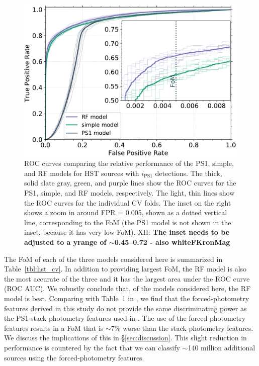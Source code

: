 \documentclass[twocolumn]{aastex63}
\newcommand{\xander}[1]{{\color{red} XH: \textbf{#1}}}
\begin{document}
\begin{figure}[t]
 \centering
  \includegraphics[width=\columnwidth]{./figures/CV_ROC_FHST.pdf}
  \caption{ ROC curves comparing the relative performance of the PS1, simple,
  and RF models for HST sources with $i_\mathrm{PS1}$ detections. The thick,
  solid slate gray, green, and purple lines show the ROC curves for the PS1,
  simple, and RF models, respectively. The light, thin lines show the ROC
  curves for the individual CV folds. The inset on the right shows a zoom in
  around FPR = 0.005, shown as a dotted vertical line, corresponding to the
  FoM (the PS1 model is not shown in the inset, because it has very low FoM).
  \xander{The inset needs to be adjusted to a yrange of $\sim$0.45--0.72 -
  also whiteFKronMag}}
  \label{fig:hst_roc}
\end{figure}

The FoM of each of the three models considered here is summarized in
Table~\ref{tbl:hst_cv}. In addition to providing largest FoM, the RF model is
also the most accurate of the three and it has the largest area under the ROC
curve (ROC AUC). We robustly conclude that, of the models considered here, the
RF model is best. Comparing with Table~1 in \citet{Tachibana18}, we find that
the forced-photometry features derived in this study do not provide the same
discriminating power as the PS1 stack-photometry features used in
\citet{Tachibana18}. The use of the forced-photometry features results in a
FoM that is $\sim$7\% worse than the stack-photometry features. We discuss the
implications of this in \S\ref{sec:discussion}. This slight reduction in
performance is countered by the fact that we can classify $\sim$140 million
additional sources using the forced-photometry features.
\end{document}

